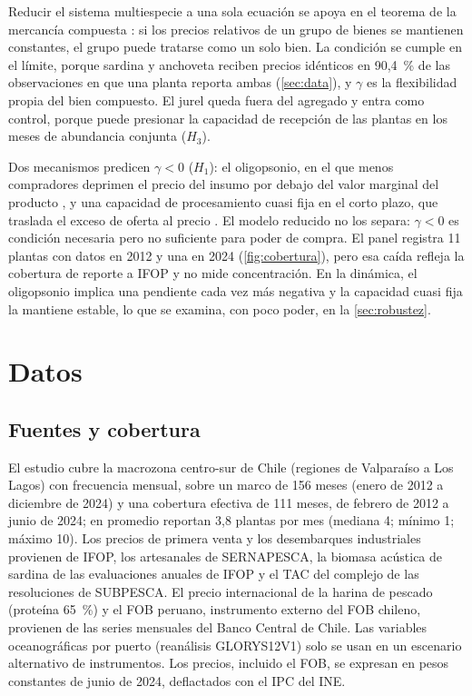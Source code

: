\documentclass[11pt]{article}
\begin{document}
Reducir el sistema multiespecie a una sola ecuación se apoya en el teorema de la mercancía compuesta \parencite{hicks1939, leontief1936}: si los precios relativos de un grupo de bienes se mantienen constantes, el grupo puede tratarse como un solo bien. La condición se cumple en el límite, porque sardina y anchoveta reciben precios idénticos en 90,4~\% de las observaciones en que una planta reporta ambas (\autoref{sec:data}), y $\gamma$ es la flexibilidad propia del bien compuesto. El jurel queda fuera del agregado y entra como control, porque puede presionar la capacidad de recepción de las plantas en los meses de abundancia conjunta ($H_3$).\label{sec:agregacion}

Dos mecanismos predicen $\gamma<0$ ($H_1$): el oligopsonio, en el que menos compradores deprimen el precio del insumo por debajo del valor marginal del producto \parencite{rubens2023}, y una capacidad de procesamiento cuasi fija en el corto plazo, que traslada el exceso de oferta al precio \parencite{dresdner2014}. El modelo reducido no los separa: $\gamma<0$ es condición necesaria pero no suficiente para poder de compra. El panel registra 11 plantas con datos en 2012 y una en 2024 (\autoref{fig:cobertura}), pero esa caída refleja la cobertura de reporte a IFOP y no mide concentración. En la dinámica, el oligopsonio implica una pendiente cada vez más negativa y la capacidad cuasi fija la mantiene estable, lo que se examina, con poco poder, en la \autoref{sec:robustez}.
\section{Datos}\label{sec:data}
\subsection{Fuentes y cobertura}

El estudio cubre la macrozona centro-sur de Chile (regiones de Valparaíso a Los Lagos) con frecuencia mensual, sobre un marco de 156 meses (enero de 2012 a diciembre de 2024) y una cobertura efectiva de 111 meses, de febrero de 2012 a junio de 2024; en promedio reportan 3,8 plantas por mes (mediana 4; mínimo 1; máximo 10). Los precios de primera venta y los desembarques industriales provienen de IFOP, los artesanales de SERNAPESCA, la biomasa acústica de sardina de las evaluaciones anuales de IFOP y el TAC del complejo de las resoluciones de SUBPESCA. El precio internacional de la harina de pescado (proteína 65~\%) y el FOB peruano, instrumento externo del FOB chileno, provienen de las series mensuales del Banco Central de Chile. Las variables oceanográficas por puerto (reanálisis GLORYS12V1) solo se usan en un escenario alternativo de instrumentos. Los precios, incluido el FOB, se expresan en pesos constantes de junio de 2024, deflactados con el IPC del INE.
\end{document}
